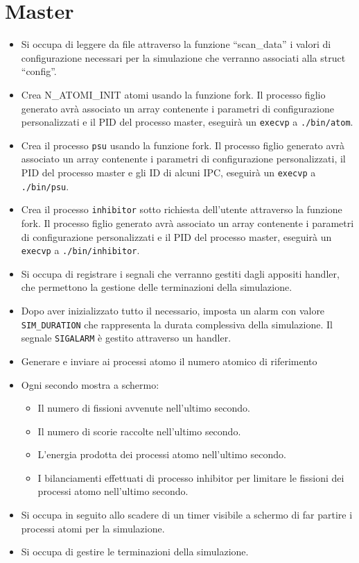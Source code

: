 \section{Master} 
\begin{itemize}
    \item Si occupa di leggere da file attraverso la funzione \enquote{scan\_data} i valori di configurazione necessari per la simulazione che verranno associati alla struct \enquote{config}. 
    \item Crea N\_ATOMI\_INIT atomi usando la funzione fork. Il processo figlio generato avrà associato un array contenente i parametri di configurazione personalizzati e il PID del processo master, eseguirà un \texttt{execvp} a \texttt{./bin/atom}.
    \item Crea il processo \texttt{psu} usando la funzione fork. Il processo figlio generato avrà associato un array contenente i parametri di configurazione personalizzati, il PID del processo master e gli ID di alcuni IPC, eseguirà un \texttt{execvp} a \texttt{./bin/psu}. 
    \item Crea il processo \texttt{inhibitor} sotto richiesta dell'utente attraverso la funzione fork. Il processo figlio generato avrà associato un array contenente i parametri di configurazione personalizzati e il PID del processo master, eseguirà un \texttt{execvp} a \texttt{./bin/inhibitor}.
    \item Si occupa di registrare i segnali che verranno gestiti dagli appositi handler, che permettono la gestione delle terminazioni della simulazione. 
    \item Dopo aver inizializzato tutto il necessario, imposta un alarm con valore \texttt{SIM\_DURATION} che rappresenta la durata complessiva della simulazione. Il segnale \texttt{SIGALARM} è gestito attraverso un handler.
    \item Generare e inviare ai processi atomo il numero atomico di riferimento 
    \item Ogni secondo mostra a schermo: 
    \begin{itemize}
        \item Il numero di fissioni avvenute nell'ultimo secondo. 
        \item Il numero di scorie raccolte nell'ultimo secondo.
        \item L'energia prodotta dei processi atomo nell'ultimo secondo.
        \item I bilanciamenti effettuati di processo inhibitor per limitare le fissioni dei processi atomo nell'ultimo secondo. 
    \end{itemize}
    \item Si occupa in seguito allo scadere di un timer visibile a schermo di far partire i processi atomi per la simulazione. 
    \item Si occupa di gestire le terminazioni della simulazione.
\end{itemize}
